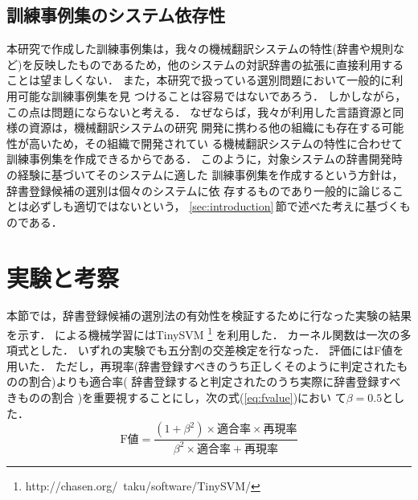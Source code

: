 \subsection{訓練事例集のシステム依存性}

本研究で作成した訓練事例集は，我々の機械翻訳システムの特性(辞書や規則な
ど)を反映したものであるため，他のシステムの対訳辞書の拡張に直接利用する
ことは望ましくない．
また，本研究で扱っている選別問題において一般的に利用可能な訓練事例集を見
つけることは容易ではないであろう．
しかしながら，この点は問題にならないと考える．
なぜならば，我々が利用した言語資源と同様の資源は，機械翻訳システムの研究
開発に携わる他の組織にも存在する可能性が高いため，その組織で開発されてい
る機械翻訳システムの特性に合わせて訓練事例集を作成できるからである．
このように，対象システムの辞書開発時の経験に基づいてそのシステムに適した
訓練事例集を作成するという方針は，辞書登録候補の選別は個々のシステムに依
存するものであり一般的に論じることは必ずしも適切ではないという，
\ref{sec:introduction}\,節で述べた考えに基づくものである．


\section{実験と考察}
\label{sec:experiment}

本節では，辞書登録候補の選別法の有効性を検証するために行なった実験の結果
を示す．
{\SVM}による機械学習にはTinySVM
\footnote{http://chasen.org/~taku/software/TinySVM/}
を利用した．
カーネル関数は一次の多項式とした．
いずれの実験でも五分割の交差検定を行なった．
評価にはF値を用いた．
ただし，再現率(辞書登録すべき{\EJP}のうち正しくそのように判定されたも
のの割合)よりも適合率(
辞書登録すると判定された{\EJP}のうち実際に辞書登録すべきものの割合
)を重要視することにし，次の式(\ref{eq:fvalue})におい
て$\beta=0.5$とした．
\begin{equation}
\mbox{F}値 = \frac{(1+\beta^2) \times 適合率 \times 再現率}
{\beta^2 \times 適合率 + 再現率}
\label{eq:fvalue}
\end{equation}

